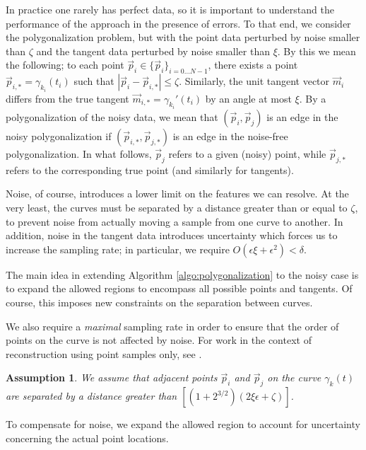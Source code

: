 \documentclass{article}
\newtheorem{assumption}{Assumption}
\numberwithin{cntr}{section}
\numberwithin{equation}{section}
\newcommand{\abs}[1]{\left| #1 \right|}%
\newcommand{\vp}[0]{{\vec{p}}}
\newcommand{\vm}[0]{{\vec{m}}}
\newcommand{\OtoN}{{0 \ldots N-1}}
\newcommand{\pointData}{{ \{ \vp_{i} \}_{i=\OtoN} }}
\newcommand{\curvesep}{{\delta}}
\newcommand{\pointNoise}{{\zeta}}
\newcommand{\tanNoise}{{\xi}}
\begin{document}
In practice one rarely has perfect data, so it is important to understand the performance of the approach in the presence of errors.
To that end, we consider the polygonalization problem, but with the point data perturbed by noise smaller than $\pointNoise$ and the tangent data perturbed by noise smaller than $\tanNoise$.
By this we mean the following; to each point $\vp_{i} \in \pointData$, there exists a point $\vp_{i,\ast} = \gamma_{k_{i}}(t_{i})$ such that $\abs{\vp_{i}-\vp_{i,\ast}} \leq \pointNoise$. Similarly, the unit tangent vector $\vm_{i}$ differs from the true tangent $\vm_{i,\ast} = \gamma_{k_{i}}'(t_{i})$ by an angle at most $\tanNoise$. By a polygonalization of the noisy data, we mean that $(\vp_{i},\vp_{j})$ is an edge in the noisy polygonalization if $(\vp_{i,\ast},\vp_{j,\ast})$ is an edge in the noise-free polygonalization. In what follows, $\vp_{j}$ refers to a given (noisy) point, while $\vp_{j,\ast}$ refers to the corresponding true point (and similarly for tangents).

Noise, of course, introduces a lower limit on the features we can resolve. At the very least, the curves must be separated by a distance greater than or equal to $\pointNoise$, to prevent noise from actually moving a sample from one curve to another. In addition, noise in the tangent data introduces uncertainty which forces us to increase the sampling rate; in particular, we require $O(\epsilon \tanNoise + \epsilon^{2}) < \curvesep$.

The main idea in extending Algorithm \ref{algo:polygonalization} to the noisy case is to expand the allowed regions to encompass all possible points and tangents. Of course, this imposes new constraints on the separation between curves.

We also require a \emph{maximal} sampling rate in order to ensure that the order of points on the curve is not affected by noise.
For work in the context of reconstruction using point samples only, see \cite{chengnoise,mdnoise}.

\begin{assumption}
  \label{ass:minSamplingRateNoisy}
  We assume that adjacent points $\vp_{i}$ and $\vp_{j}$ on the curve $\gamma_{k}(t)$ are separated by a distance greater
  than $[(1+2^{3/2})(2 \tanNoise \epsilon + \pointNoise)]$.
\end{assumption}

To compensate for noise, we expand the allowed region to account
for uncertainty concerning the actual point locations.
\end{document}

